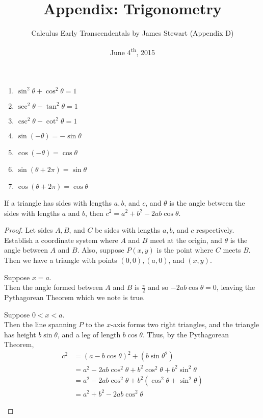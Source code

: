 \documentclass[a4paper,8pt]{article}
\title{Appendix: Trigonometry}
\author{Calculus Early Transcendentals by James Stewart (Appendix D)}
\date{June 4\textsuperscript{th}, 2015}
\begin{document}
\maketitle
{}

\begin{outline}

    \begin{enumerate}
      \item \(\sin^2\theta + \cos^2\theta = 1\)
      \item \(\sec^2\theta - \tan^2\theta = 1\)
      \item \(\csc^2\theta - \cot^2\theta = 1\)
      \item \(\sin{(-\theta)} = -\sin{\theta}\)
      \item \(\cos{(-\theta)} = \cos{\theta}\)
      \item \(\sin{(\theta + 2\pi)} = \sin{\theta}\)
      \item \(\cos{(\theta + 2\pi)} = \cos{\theta}\)
    \end{enumerate}

    If a triangle has sides with lengths \(a, b\), and \(c\), and \(\theta\) is the angle between the sides
    with lengths \(a\) and \(b\), then \(c^2 = a^2 + b^2 - 2ab\cos{\theta}\).

    \begin{proof}
      Let sides \(A, B\), and \(C\) be sides with lengths \(a, b\), and \(c\) respectively. Establish a coordinate
      system where \(A\) and \(B\) meet at the origin, and \(\theta\) is the angle between \(A\) and \(B\). Also,
      suppose \(P(x, y)\) is the point where \(C\) meets \(B\). Then we have a triangle with points \((0, 0), (a, 0)\),
      and \((x, y)\).

      \begin{proofcases}
        \item
          Suppose \(x = a\).\\
          Then the angle formed between \(A\) and \(B\) is \(\frac{\pi}{2}\) and so \(-2ab\cos{\theta} = 0\),
          leaving the Pythagorean Theorem which we note is true.
        \item
          Suppose \(0 < x < a\).\\
          Then the line spanning \(P\) to the \(x\)-axis forms two right triangles, and the triangle has height
          \(b\sin{\theta}\), and a leg of length \(b\cos{\theta}\). Thus, by the Pythagorean Theorem,
          \begin{align*}
            c^2 &= (a-b\cos{\theta})^2 + (b\sin{\theta}^2) \\
                &= a^2 - 2ab\cos^2{\theta} + b^2\cos^2{\theta} + b^2\sin^2{\theta}\\
                &= a^2 - 2ab\cos^2{\theta} + b^2(\cos^2{\theta} + \sin^2{\theta}) \\
                &= a^2 + b^2 - 2ab\cos^2{\theta}
          \end{align*}
      \end{proofcases}
    \end{proof}


\end{outline}
\end{document}
